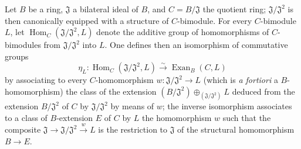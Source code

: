 \begin{proposition}[18.3.8]
\label{0.18.3.8}
Let $B$ be a ring, $\mathfrak{J}$ a bilateral ideal of $B$, and $C=B/\mathfrak{J}$ the quotient ring; $\mathfrak{J}/\mathfrak{J}^2$ is then canonically equipped with a structure of $C$-bimodule.
For every $C$-bimodule $L$, let $\operatorname{Hom}_C(\mathfrak{J}/\mathfrak{J}^2,L)$ denote the additive group of homomorphisms of $C$-bimodules from $\mathfrak{J}/\mathfrak{J}^2$ into $L$.
One defines then an \textup{isomorphism} of commutative groups
\begin{equation}
\tag{18.3.8.1}
  \label{0.18.3.8.1}
  \eta_L:\operatorname{Hom}_C(\mathfrak{J}/\mathfrak{J}^2,L)\xrightarrow{\sim}\operatorname{Exan}_B(C,L)
\end{equation}
by associating to every $C$-homomorphism $w:\mathfrak{J}/\mathfrak{J}^2\to L$ \textup{(which is \emph{a fortiori} a $B$-homomorphism)} the class of the extension $(B/\mathfrak{J}^2)\oplus_{(\mathfrak{J}/\mathfrak{J}^2)} L$ deduced from the extension $B/\mathfrak{J}^2$ of $C$ by $\mathfrak{J}/\mathfrak{J}^2$ by means of $w$; the inverse isomorphism associates to a class of $B$-extension $E$ of $C$ by $L$ the homomorphism $w$ such that the composite $\mathfrak{J}\to\mathfrak{J}/\mathfrak{J}^2\xrightarrow{w} L$ is the restriction to $\mathfrak{J}$ of the structural homomorphism $B\to E$.
\end{proposition}


